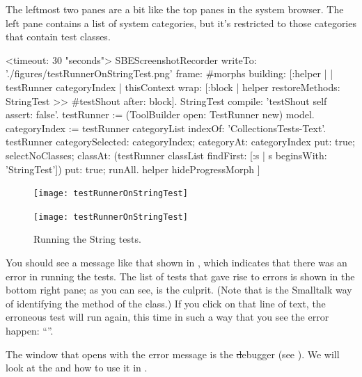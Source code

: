 \documentclass[a4paper,10pt,twoside]{book}
\begin{document}
The leftmost two panes are a bit like the top panes in the system browser.
The left pane contains a list of system categories, but it's restricted to those categories that contain test classes.


\begin{ExecuteSmalltalkScript}
<timeout: 30 "seconds">
SBEScreenshotRecorder writeTo: './figures/testRunnerOnStringTest.png' frame: #morphs building: [:helper |
	| testRunner categoryIndex |
	thisContext wrap: [:block | helper restoreMethods: {StringTest >> #testShout} after: block].
	StringTest compile: 'testShout self assert: false'.
	testRunner := (ToolBuilder open: TestRunner new) model.
	categoryIndex := testRunner categoryList indexOf: 'CollectionsTests-Text'.
	testRunner
		categorySelected: categoryIndex;
		categoryAt: categoryIndex put: true;
		selectNoClasses;
		classAt: (testRunner classList findFirst: [:s | s beginsWith: 'StringTest']) put: true;
		runAll.
	helper hideProgressMorph
]
\end{ExecuteSmalltalkScript}

\begin{figure}[hbt]
\ifluluelse
	{\centerline {\texttt{[image: testRunnerOnStringTest]}}}
	{\centerline {\texttt{[image: testRunnerOnStringTest]}}}
\caption{Running the String tests.
\label{fig:testRunnerTestShout}}
\end{figure}

You should see a message like that shown in , which indicates that there was an error in running the tests.
The list of tests that gave rise to errors is shown in the bottom right pane; as you can see,  is the culprit.
(Note that  is the Smalltalk way of identifying the  method of the  class.)
If you click on that line of text, the erroneous test will run again, this time in such a way that you see the error happen: ``''.

The window that opens with the error message is the \st debugger (see ).
We will look at the  and how to use it in .
\end{document}
